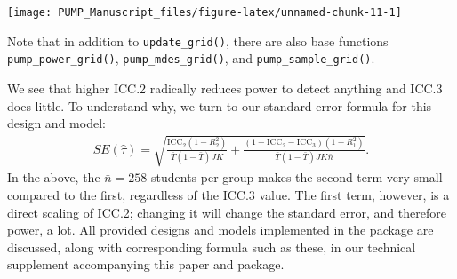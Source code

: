\documentclass[
]{article}
\newenvironment{Shaded}{\begin{snugshade}}{\end{snugshade}}
\newcommand{\AttributeTok}[1]{\textcolor[rgb]{0.77,0.63,0.00}{#1}}
\newcommand{\DecValTok}[1]{\textcolor[rgb]{0.00,0.00,0.81}{#1}}
\newcommand{\FloatTok}[1]{\textcolor[rgb]{0.00,0.00,0.81}{#1}}
\newcommand{\FunctionTok}[1]{\textcolor[rgb]{0.00,0.00,0.00}{#1}}
\newcommand{\NormalTok}[1]{#1}
\newcommand{\OtherTok}[1]{\textcolor[rgb]{0.56,0.35,0.01}{#1}}
\newcommand{\SpecialCharTok}[1]{\textcolor[rgb]{0.00,0.00,0.00}{#1}}
\newcommand{\StringTok}[1]{\textcolor[rgb]{0.31,0.60,0.02}{#1}}
\begin{document}
\begin{Shaded}
\end{Shaded}

\begin{center}\texttt{[image: PUMP\_Manuscript\_files/figure-latex/unnamed-chunk-11-1]} \end{center}

Note that in addition to \texttt{update\_grid()}, there are also base
functions \texttt{pump\_power\_grid()}, \texttt{pump\_mdes\_grid()}, and
\texttt{pump\_sample\_grid()}.

We see that higher ICC.2 radically reduces power to detect anything and
ICC.3 does little. To understand why, we turn to our standard error
formula for this design and model: \[
\begin{aligned}
SE( \hat{\tau} ) = \sqrt{
\frac{\text{ICC}_{2}(1 - R^2_{2})}{\bar{T}(1 - \bar{T}) JK} +
\frac{(1-\text{ICC}_{2} - \text{ICC}_{3})(1-R^2_{1})}{\bar{T}(1 - \bar{T}) J K\bar{n}} } .
\end{aligned}
\] In the above, the \(\bar{n} = 258\) students per group makes the
second term very small compared to the first, regardless of the ICC.3
value. The first term, however, is a direct scaling of ICC.2; changing
it will change the standard error, and therefore power, a lot. All
provided designs and models implemented in the package are discussed,
along with corresponding formula such as these, in our technical
supplement accompanying this paper and package.
\end{document}
